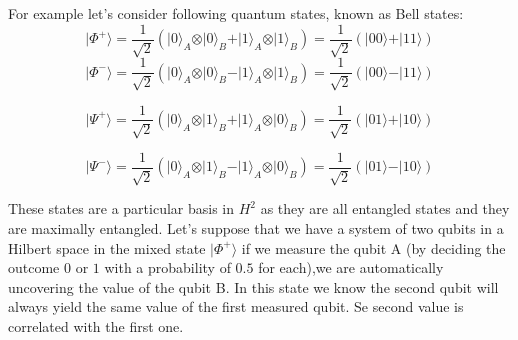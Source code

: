 For example let's consider following quantum states, known as Bell states:
\begin{equation}
\vert\Phi^{+}\rangle=\frac{1}{\sqrt{2}}(\vert0\rangle_{A} \otimes\vert0\rangle_{B} +\vert1\rangle_{A} \otimes\vert1\rangle_{B})=\frac{1}{\sqrt{2}}(\vert00\rangle+\vert11\rangle)
\end{equation}
\begin{equation}
\vert\Phi^{-}\rangle=\frac{1}{\sqrt{2}}(\vert0\rangle_{A} \otimes\vert0\rangle_{B} -\vert1\rangle_{A} \otimes\vert1\rangle_{B})=\frac{1}{\sqrt{2}}(\vert00\rangle-\vert11\rangle)
\end{equation}


\begin{equation}
\vert\Psi^{+}\rangle=\frac{1}{\sqrt{2}}(\vert0\rangle_{A} \otimes\vert1\rangle_{B} +\vert1\rangle_{A}\otimes\vert0\rangle_{B})=\frac{1}{\sqrt{2}}(\vert01\rangle+\vert10\rangle)
\end{equation}


\begin{equation}
\vert\Psi^{-}\rangle=\frac{1}{\sqrt{2}}(\vert0\rangle_{A} \otimes\vert1\rangle_{B} -\vert1\rangle_{A} \otimes\vert0\rangle_{B})=\frac{1}{\sqrt{2}}(\vert01\rangle-\vert10\rangle)
\end{equation}

These states are a particular basis in $H^2$ as they are all entangled states and they are maximally entangled. Let's suppose that we have a system of two qubits in a Hilbert space in the mixed state $\vert\Phi^{+}\rangle$ if we measure the qubit A (by deciding the outcome $0$ or $1$ with a probability of $0.5$ for each),we are automatically uncovering the value of the qubit B. In this state we know the second qubit will always yield the same value of the first measured qubit. Se second value is correlated with the first one.



\begin{comment}
	\item Born Rule probabilities
falar aqui das funções oraculo
\end{comment}



%




 


